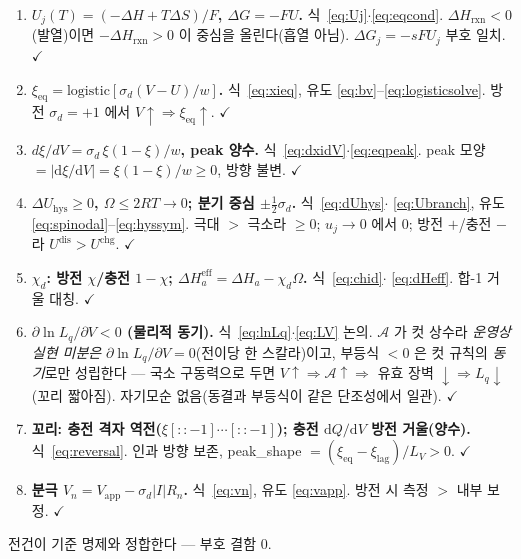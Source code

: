 \documentclass[11pt,a4paper]{article}
\newcommand{\dd}{\mathrm{d}}
\newcommand{\eff}{\mathrm{eff}}
\newcommand{\eq}{\mathrm{eq}}
\newcommand{\app}{\mathrm{app}}
\newcommand{\rxn}{\mathrm{rxn}}
\newcommand{\dis}{\mathrm{dis}}
\newcommand{\chg}{\mathrm{chg}}
\newcommand{\hys}{\mathrm{hys}}
\begin{document}
\begin{enumerate}[label=\textbf{S\arabic*.},leftmargin=2.6em,itemsep=2pt]
\item \textbf{$U_j(T)=(-\Delta H+T\Delta S)/F$, $\Delta G=-FU$.} 식~\eqref{eq:Uj}$\cdot$\eqref{eq:eqcond}. $\Delta H_\rxn<0$
(발열)이면 $-\Delta H_\rxn>0$ 이 중심을 올린다(흡열 아님). $\Delta G_j=-sFU_j$ 부호 일치. $\checkmark$
\item \textbf{$\xi_\eq=\mathrm{logistic}[\sigma_d(V-U)/w]$.} 식~\eqref{eq:xieq}, 유도 \eqref{eq:bv}--\eqref{eq:logisticsolve}. 방전 $\sigma_d=+1$ 에서
$V\!\uparrow\Rightarrow\xi_\eq\!\uparrow$. $\checkmark$
\item \textbf{$d\xi/dV=\sigma_d\,\xi(1-\xi)/w$, peak 양수.} 식~\eqref{eq:dxidV}$\cdot$\eqref{eq:eqpeak}. peak 모양 $=|\dd\xi/\dd V|=
\xi(1-\xi)/w\ge0$, 방향 불변. $\checkmark$
\item \textbf{$\Delta U_\hys\ge0$, $\Omega\le2RT\to0$; 분기 중심 $\pm\tfrac12\sigma_d$.} 식~\eqref{eq:dUhys}$\cdot$
\eqref{eq:Ubranch}, 유도 \eqref{eq:spinodal}--\eqref{eq:hyssym}. 극대 $>$ 극소라 $\ge0$; $u_j\to0$ 에서 $0$; 방전 $+$/충전 $-$ 라 $U^{\dis}>U^{\chg}$. $\checkmark$
\item \textbf{$\chi_d$: 방전 $\chi$/충전 $1-\chi$; $\Delta H_a^\eff=\Delta H_a-\chi_d\Omega$.} 식~\eqref{eq:chid}$\cdot$
\eqref{eq:dHeff}. 합-1 거울 대칭. $\checkmark$
\item \textbf{$\partial\ln L_q/\partial V<0$ (물리적 동기).} 식~\eqref{eq:lnLq}$\cdot$\eqref{eq:LV} 논의. $\mathcal A$ 가
컷 상수라 \emph{운영상 실현 미분은} $\partial\ln L_q/\partial V=0$(전이당 한 스칼라)이고, 부등식 $<0$ 은 컷 규칙의
\emph{동기}로만 성립한다 — 국소 구동력으로 두면 $V\!\uparrow\Rightarrow\mathcal A\!\uparrow\Rightarrow$ 유효 장벽
$\downarrow\Rightarrow L_q\downarrow$(꼬리 짧아짐). 자기모순 없음(동결과 부등식이 같은 단조성에서 일관). $\checkmark$
\item \textbf{꼬리: 충전 격자 역전($\xi[::-1]\cdots[::-1]$); 충전 $\dd Q/\dd V$ 방전 거울(양수).} 식~\eqref{eq:reversal}.
인과 방향 보존, peak\_shape $=(\xi_\eq-\xi_\mathrm{lag})/L_V>0$. $\checkmark$
\item \textbf{분극 $V_n=V_\app-\sigma_d|I|R_n$.} 식~\eqref{eq:vn}, 유도 \eqref{eq:vapp}. 방전 시 측정 $>$ 내부 보정. $\checkmark$
\end{enumerate}
전건이 기준 명제와 정합한다 — 부호 결함 $0$.
\end{document}
